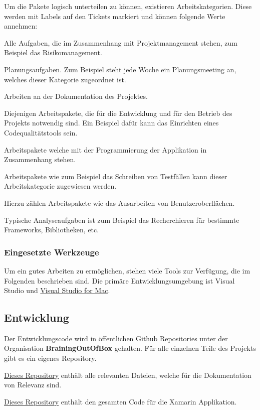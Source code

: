 Um die Pakete logisch unterteilen zu können, existieren Arbeitskategorien. Diese werden mit Labels auf den Tickets markiert und können folgende Werte annehmen:
\begin{description}[leftmargin=!,labelwidth=\widthof{\bfseries ProjektManagement}]
	\item[ProjektManagement] Alle Aufgaben, die im Zusammenhang mit Projektmanagement stehen, zum Beispiel das Risikomanagement.
	\item[Planung] Planungsaufgaben. Zum Beispiel steht jede Woche ein Planungsmeeting an, welches dieser Kategorie zugeordnet ist.
	\item[Dokumentation] Arbeiten an der Dokumentation des Projektes.
	\item[Infrastruktur] Diejenigen Arbeitspakete, die für die Entwicklung und für den Betrieb des Projekts notwendig sind. Ein Beispiel dafür kann das Einrichten eines Codequalitätstools sein. 
	\item[Entwicklung] Arbeitspakete welche mit der Programmierung der Applikation in Zusammenhang stehen.
	\item[Testing] Arbeitspakete wie zum Beispiel das Schreiben von Testfällen kann dieser Arbeitskategorie zugewiesen werden.
	\item[Design] Hierzu zählen Arbeitspakete wie das Ausarbeiten von Benutzeroberflächen.
	\item[Analyse] Typische Analyseaufgaben ist zum Beispiel das Recherchieren für bestimmte Frameworks, Bibliotheken, etc. 
\end{description}

\subsubsection*{Eingesetzte Werkzeuge}
Um ein gutes Arbeiten zu ermöglichen, stehen viele Tools zur Verfügung, die im Folgenden beschrieben sind. Die primäre Entwicklungsumgebung ist Visual Studio und \href{https://visualstudio.microsoft.com/de/vs/mac/}{Visual Studio for Mac}.

\subsection{Entwicklung}
Der Entwicklungscode wird in öffentlichen Github Repositories unter der Organisation \textbf{BrainingOutOfBox }gehalten. Für alle einzelnen Teile des Projekts gibt es ein eigenes Repository.

\begin{description}[leftmargin=!,labelwidth=2cm]
\item [Doc] \href{https://github.com/BrainingOutOfBox/Doc}{Dieses Repository} enthält alle relevanten Dateien, welche für die Dokumentation von Relevanz sind.
\item [App] \href{https://github.com/BrainingOutOfBox/Doc}{Dieses Repository} enthält den gesamten Code für die Xamarin Applikation.
\end{description}

